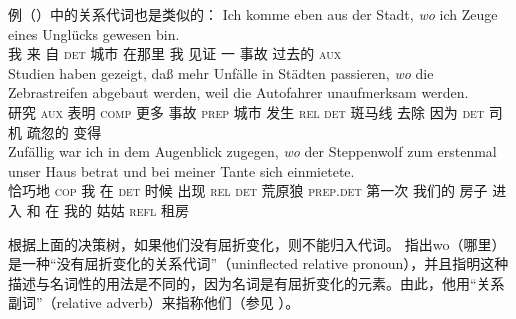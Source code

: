 例（）中的关系代词也是类似的：
\eal
\ex 
\gll Ich komme eben        aus der          Stadt, \emph{wo}    ich Zeuge eines Unglücks gewesen bin.\footnotemark\\
     我  来     \particle{} 自  \textsc{det} 城市   在那里 我  见证  一 事故 过去的 \textsc{aux} \\
\label{bsp-wo-ich-zeuge}
\ex 
\gll Studien haben    gezeigt, daß           mehr Unfälle in       Städten passieren, \emph{wo}    die   Zebrastreifen abgebaut werden, weil die Autofahrer unaufmerksam werden.\footnotemark\\
     研究 \textsc{aux} 表明     \textsc{comp} 更多 事故 \textsc{prep} 城市    发生        \textsc{rel} \textsc{det} 斑马线  去除 \passiveprs{} 因为 \textsc{det} 司机 疏忽的 变得\\
\ex 
\gll Zufällig war ich in dem Augenblick zugegen, \emph{wo} der Steppenwolf zum erstenmal unser Haus betrat und bei meiner Tante sich einmietete.\footnotemark\\
     恰巧地 \textsc{cop} 我 在 \textsc{det} 时候 出现 \textsc{rel} \textsc{det} 荒原狼 \textsc{prep}.\textsc{det} 第一次 我们的 房子 进入 和 在 我的 姑姑 \textsc{refl} 租房\\

\zl

根据上面的决策树，如果他们没有屈折变化，则不能归入代词。 \citet[]{Eisenberg2004a} 指出wo（哪里）是一种“没有屈折变化的关系代词”（uninflected relative pronoun），并且指明这种描述与名词性的用法是不同的，因为名词是有屈折变化的元素。由此，他用“关系副词”（relative adverb）来指称他们（参见 ）。

